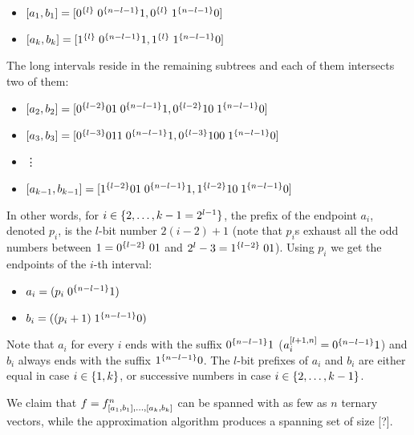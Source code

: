 \begin{itemize}
\item
$[a_1, b_1] =
[0^{\{l\}} \; 0^{\{n-l-1\}} 1, 0^{\{l\}} \; 1^{\{n-l-1\}} 0]$
\item
$[a_k, b_k] =
[1^{\{l\}} \; 0^{\{n-l-1\}} 1, 1^{\{l\}} \; 1^{\{n-l-1\}} 0]$
\end{itemize}

The long intervals reside in the remaining subtrees
and each of them intersects two of them:

\begin{itemize}
\item
$[a_2, b_2] =
[0^{\{l-2\}} 01 \; 0^{\{n-l-1\}} 1, 0^{\{l-2\}} 10 \; 1^{\{n-l-1\}} 0]$
\item
$[a_3, b_3] =
[0^{\{l-3\}} 011 \; 0^{\{n-l-1\}} 1, 0^{\{l-3\}} 100 \; 1^{\{n-l-1\}} 0]$
\item \vdots
{}
\item
$[a_{k-1}, b_{k-1}] =
[1^{\{l-2\}} 01 \; 0^{\{n-l-1\}} 1, 1^{\{l-2\}} 10 \; 1^{\{n-l-1\}} 0]$
\end{itemize}

In other words,
for $i \in \{2, \ldots, k-1 = 2^{l-1}\}$,
the prefix of the endpoint $a_i$,
denoted $p_i$,
is the $l$-bit number $2 (i-2) + 1$
(note that $p_i$s exhaust all the odd numbers
between $1 = 0^{\{l-2\}} \; 01$
and $2^l - 3 = 1^{\{l-2\}} \; 01$).
Using $p_i$ we get the endpoints of the $i$-th interval:

\begin{itemize}
\item $a_i = (p_i \; 0^{\{n-l-1\}} 1)$
\item $b_i = ((p_i + 1) \; 1^{\{n-l-1\}} 0)$
\end{itemize}

Note that $a_i$ for every $i$
ends with the suffix $0^{\{n-l-1\}} 1$
($a_i^{[l+1, n]} = 0^{\{n-l-1\}} 1$)
and $b_i$ always ends with the suffix $1^{\{n-l-1\}} 0$.
The $l$-bit prefixes of $a_i$ and $b_i$
are either equal
in case $i \in \{1, k\}$,
or successive numbers in case
$i \in \{2, \ldots, k-1\}$.

We claim that $f =
f^n_{[a_1, b_1], \ldots, [a_k, b_k]}$
can be spanned with as few as $n$
ternary vectors,
while the approximation algorithm produces a spanning set
of size [?].

